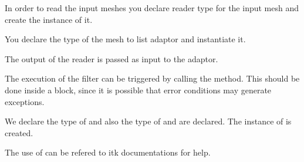 \documentclass{InsightArticle}
\begin{document}
\begin{center}

\end{center}

In order to read the input meshes you declare reader type for the input mesh
and create the instance of it.

\begin{center}

\end{center}


You declare the type of the mesh to list adaptor and instantiate it.

\begin{center}

\end{center}

The output of the reader is passed as input to the adaptor.

\begin{center}

\end{center}


The execution of the filter can be triggered by calling the  method.
This should be done inside a  block, since it is possible that error
conditions may generate exceptions.

\begin{center}

\end{center}

We declare the type of  and also the type
of  and  are declared. The instance of
  is created.

\begin{center}

\end{center}

The use of  can be refered to itk documentations
for help.

\begin{center}

\end{center}
\end{document}
